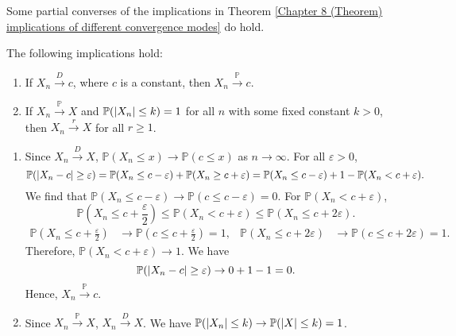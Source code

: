 \documentclass{huhtakm-template-book-v2}
\newcommand{\prob}{\mathbb{P}}
\begin{document}
    Some partial converses of the implications in Theorem \ref{Chapter 8 (Theorem) implications of different convergence modes} do hold.
    \begin{thm}
        \label{Chapter 8 (Theorem) Partial converse statements}
        The following implications hold:
        \begin{enumerate}
            \item If $X_{n} \xrightarrow{D} c$, where $c$ is a constant, then $X_{n} \xrightarrow{\prob} c$.
            \item If $X_{n} \xrightarrow{\prob} X$ and $\prob(\abs{X_{n}} \leq k) = 1$ for all $n$ with some fixed constant $k > 0$, then $X_{n} \xrightarrow{r} X$ for all $r \geq 1$.
        \end{enumerate}
    \end{thm}
    \begin{proofing}
        \begin{enumerate}
            \item Since $X_{n} \xrightarrow{D} X$, $\prob(X_{n} \leq x) \to \prob(c \leq x)$ as $n \to \infty$. For all $\varepsilon > 0$,
            \begin{equation*}
                \prob(\abs{X_{n}-c} \geq \varepsilon) = \prob(X_{n} \leq c-\varepsilon)+\prob(X_{n} \geq c+\varepsilon) = \prob(X_{n} \leq c-\varepsilon)+1-\prob(X_{n} < c+\varepsilon).
            \end{equation*}
            We find that $\prob(X_{n} \leq c-\varepsilon) \to \prob(c \leq c-\varepsilon) = 0$. For $\prob(X_{n} < c+\varepsilon)$,
            \begin{equation*}
                \prob\left(X_{n} \leq c+\frac{\varepsilon}{2}\right) \leq \prob(X_{n} < c+\varepsilon) \leq \prob(X_{n} \leq c+2\varepsilon).
            \end{equation*}
            \begin{align*}
                \prob\left(X_{n} \leq c+\frac{\varepsilon}{2}\right) &\to \prob\left(c \leq c+\frac{\varepsilon}{2}\right) = 1, & \prob(X_{n} \leq c+2\varepsilon) &\to \prob(c \leq c+2\varepsilon) = 1.
            \end{align*}
            Therefore, $\prob(X_{n} < c+\varepsilon) \to 1$. We have
            \begin{equation*}
                \prob(\abs{X_{n}-c} \geq \varepsilon) \to 0+1-1 = 0.
            \end{equation*}
            Hence, $X_{n} \xrightarrow{\prob} c$.
            \item Since $X_{n} \xrightarrow{\prob} X$, $X_{n} \xrightarrow{D} X$. We have $\prob(\abs{X_{n}} \leq k) \to \prob(\abs{X} \leq k) = 1$.\\

\end{enumerate}
\end{proofing}
\end{document}
